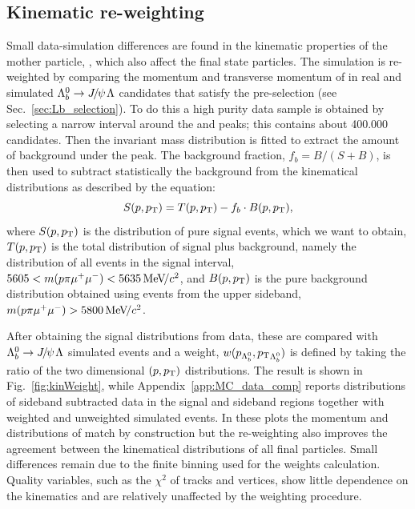 \subsection{Kinematic re-weighting}
\label{sec:kinWeight}

Small data-simulation differences are found in the kinematic properties of the mother particle, \Lb,
which also affect the final state particles. The simulation is re-weighted by 
comparing the momentum and transverse momentum of \Lb in 
real and simulated $\Lb\to\jpsi\Lz$ candidates that satisfy the pre-selection (see Sec.~\ref{sec:Lb_selection}).
To do this a high purity data sample is obtained by selecting a narrow interval around the \jpsi 
and \Lb peaks; this contains about 400.000 candidates.
Then the \Lb invariant mass distribution is fitted to extract the amount of background under the peak.
The background fraction, $f_b = B/(S+B)$, is then used to subtract statistically 
the background from the kinematical distributions as described by the equation:
%
\begin{equation}
S(p,\mbox{$p_{\rm T}$}) = T(p,\mbox{$p_{\rm T}$}) - f_b\cdot B(p,\mbox{$p_{\rm T}$}),
\end{equation}
\noindent
where $S(p,\mbox{$p_{\rm T}$})$ is the distribution of pure signal events, which we want to obtain, $T(p,\mbox{$p_{\rm T}$})$ is the total
distribution of signal plus background, namely the distribution of all events in the signal interval,
$5605 < m(p\pi\mumu) < 5635 \mevcc$, and $B(p,\mbox{$p_{\rm T}$})$ is the pure background
distribution obtained using events from the upper sideband, $m(p\pi\mumu) > 5800 \mevcc$.

After obtaining the signal distributions from data, these are compared with \mbox{$\Lb\to\jpsi\Lz$} simulated events
and a weight, $w(p_{{{\Lambda}^0_{b}}},\mbox{$p_{\rm T}$}_{{{\Lambda}^0_{b}}})$ is defined by taking the ratio of the two dimensional $(p,\mbox{$p_{\rm T}$})$ distributions.
The result is shown in Fig.~\ref{fig:kinWeight}, while Appendix~\ref{app:MC_data_comp} reports distributions
of sideband subtracted data in the signal and sideband regions together with weighted and unweighted simulated events.
In these plots the momentum and \pt distributions of \Lb match by construction but the re-weighting also improves the agreement 
between the kinematical distributions of all final particles. Small differences remain due to
the finite binning used for the weights calculation. Quality variables, such as the $\chi^2$ of tracks
and vertices, show little dependence on the kinematics and are relatively unaffected by the weighting procedure.

